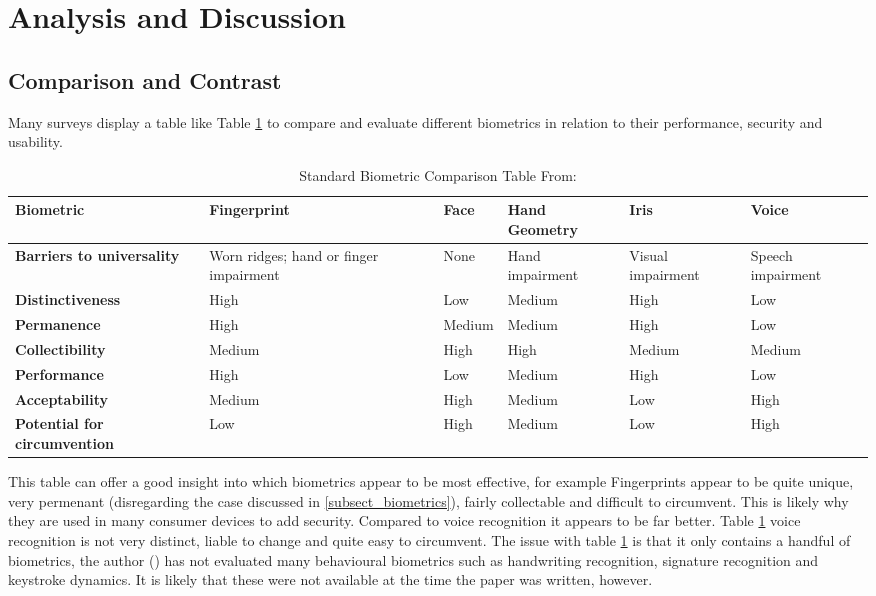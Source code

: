 \documentclass[12pt]{article}
\begin{document}
	\section{Analysis and Discussion}
	\label{sect_analysis}
	\subsection{Comparison and Contrast}
	Many surveys display a table like Table \ref{tab:common_comparison} to compare and evaluate different biometrics in relation to their performance, security and usability.

    \begin{table}[H]
        \centering
        \begin{tabular}{|p{3cm}|p{2.5cm}|p{1.5cm}|p{2cm}|p{2cm}|p{2cm}|}
            \hline
             \textbf{Biometric} & \textbf{Fingerprint} & \textbf{Face} & \textbf{Hand Geometry} & \textbf{Iris} & \textbf{Voice} \\
             \hline
             \textbf{Barriers to universality} & Worn ridges; hand or finger impairment & None & Hand impairment & Visual impairment & Speech impairment \\\hline
             \textbf{Distinctiveness} & High & Low & Medium & High & Low\\\hline
             \textbf{Permanence} & High & Medium & Medium & High & Low\\\hline
             \textbf{Collectibility} & Medium & High & High & Medium & Medium\\\hline
             \textbf{Performance} & High & Low & Medium & High & Low \\\hline
             \textbf{Acceptability} & Medium & High & Medium & Low & High \\\hline
             \textbf{Potential for circumvention} & Low & High & Medium & Low & High \\\hline
        \end{tabular}
        \caption{Standard Biometric Comparison Table From: \cite{prabhakar2003biometric}}
        \label{tab:common_comparison}
    \end{table}
	
	This table can offer a good insight into which biometrics appear to be most effective, for example Fingerprints appear to be quite unique, very permenant (disregarding the case discussed in \ref{subsect_biometrics}), fairly collectable and difficult to circumvent. This is likely why they are used in many consumer devices to add security. Compared to voice recognition it appears to be far better. Table \ref{tab:common_comparison} voice recognition is not very distinct, liable to change and quite easy to circumvent.
	The issue with table \ref{tab:common_comparison} is that it only contains a handful of biometrics, the author (\cite{prabhakar2003biometric}) has not evaluated many behavioural biometrics such as handwriting recognition, signature recognition and keystroke dynamics. It is likely that these were not available at the time the paper was written, however.
	
\end{document}

